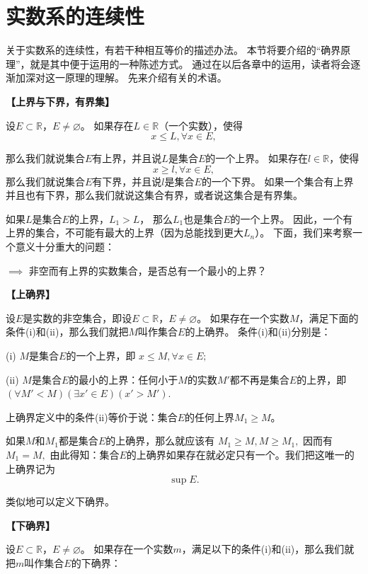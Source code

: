 \documentclass[12pt,a4paper,oneside]{ctexbook}
\begin{document}
\else%
\fi

\section{实数系的连续性}


关于实数系的连续性，有若干种相互等价的描述办法。
本节将要介绍的“确界原理”，就是其中便于运用的一种陈述方式。
通过在以后各章中的运用，读者将会逐渐加深对这一原理的理解。
先来介绍有关的术语。

\textbf{【上界与下界，有界集】}

设$E \subset \mathbb{R}$，$E \neq \varnothing$。
如果存在$L \in \mathbb{R}$（一个实数），使得  
$$x \leq L, \forall x \in E,$$

那么我们就说集合$E$有上界，并且说$L$是集合$E$的一个上界。
如果存在$l \in \mathbb{R}$，使得  
$$x \geq l, \forall x \in E,$$  
那么我们就说集合$E$有下界，并且说$l$是集合$E$的一个下界。
如果一个集合有上界并且也有下界，那么我们就说这集合有界，或者说这集合是有界集。

如果$L$是集合$E$的上界，$L_1 > L$，
那么$L_1$也是集合$E$的一个上界。
因此，一个有上界的集合，不可能有最大的上界（因为总能找到更大$L_n$）。
下面，我们来考察一个意义十分重大的问题：

$\implies$ 非空而有上界的实数集合，是否总有一个最小的上界？




\textbf{【上确界】}

设$E$是实数的非空集合，即设$E \subset \mathbb{R}$，$E \neq \varnothing$。
如果存在一个实数$M$，满足下面的条件(i)和(ii)，那么我们就把$M$叫作集合$E$的上确界。
条件(i)和(ii)分别是：

(i) $M$是集合$E$的一个上界，即  
$x \leq M, \forall x \in E;$  

(ii) $M$是集合$E$的最小的上界：任何小于$M$的实数$M'$都不再是集合$E$的上界，即  
$(\forall M' < M)(\exists x' \in E)(x' > M').$  

上确界定义中的条件(ii)等价于说：集合$E$的任何上界$M_1 \geq M$。

如果$M$和$M_1$都是集合$E$的上确界，那么就应该有  
$M_1 \geq M, M \geq M_1,$  
因而有  
$M_1 = M,$  
由此得知：集合$E$的上确界如果存在就必定只有一个。我们把这唯一的上确界记为$$\sup E.$$

类似地可以定义下确界。

\textbf{【下确界】}

设$E \subset \mathbb{R}$，$E \neq \varnothing$。
如果存在一个实数$m$，满足以下的条件(i)和(ii)，那么我们就把$m$叫作集合$E$的下确界：  
\end{document}
